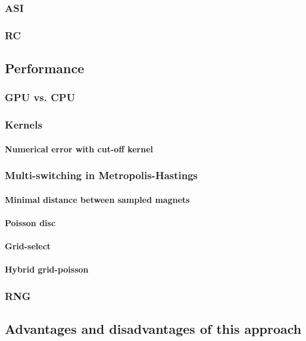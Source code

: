 \subsubsection{ASI}
\subsubsection{RC}
\subsection{Performance} %
\subsubsection{GPU vs. CPU}
\subsubsection{Kernels} %
\paragraph{Numerical error with cut-off kernel}
\subsubsection{Multi-switching in Metropolis-Hastings}
\paragraph{Minimal distance between sampled magnets} %
\paragraph{Poisson disc}
\paragraph{Grid-select}
\paragraph{Hybrid grid-poisson}
\subsubsection{RNG} %
\subsection{Advantages and disadvantages of this approach} %
